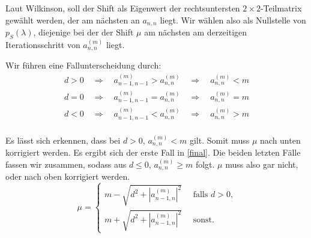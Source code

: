 \documentclass[11pt]{article}
\theoremstyle{plain}
\theoremstyle{definition}
\renewcommand{\a}{\"{a}}
\renewcommand{\u}{\"{u}}
\begin{document}
Laut Wilkinson, soll der Shift als Eigenwert der rechtsuntersten $2\times 2$-Teilmatrix gew\a hlt werden, der am n\a chsten an $a_{n,n}$ liegt. Wir w\a hlen also als Nullstelle von $p_S(\lambda)$, diejenige bei der der Shift $\mu$ am n\a chsten am derzeitigen Iterationsschritt von $a_{n,n}^{(m)}$ liegt.

Wir f\u hren eine Fallunterscheidung durch:
\begin{align*}
d>0 \quad \Rightarrow \quad a_{n-1,n-1}^{(m)} > a_{n,n}^{(m)}  \quad \Rightarrow \quad a_{n,n}^{(m)} < m \\
d=0 \quad \Rightarrow \quad a_{n-1,n-1}^{(m)} = a_{n,n}^{(m)}  \quad \Rightarrow \quad a_{n,n}^{(m)} = m \\
d<0 \quad \Rightarrow \quad a_{n-1,n-1}^{(m)} < a_{n,n}^{(m)}  \quad \Rightarrow \quad a_{n,n}^{(m)} > m \\
\end{align*}

Es l\a sst sich erkennen, dass bei $d>0$, $a_{n,n}^{(m)} < m$ gilt. Somit muss $\mu$ nach unten korrigiert werden. Es ergibt sich der erste Fall in \eqref{final}. Die beiden letzten F\a lle fassen wir zusammen, sodass aus $d\leq 0$, $a_{n,n}^{(m)} \geq m$ folgt. $\mu$ muss also gar nicht, oder nach oben korrigiert werden.
\begin{equation}
\mu = 
\begin{cases}
m - \sqrt{d^2 + |a_{n-1,n}^{(m)}|^2} \quad \text{ falls $d>0$,} \\
m + \sqrt{d^2 + |a_{n-1,n}^{(m)}|^2} \quad \text{ sonst.} 
\end{cases}
\label{final}
\end{equation}
\end{document}
